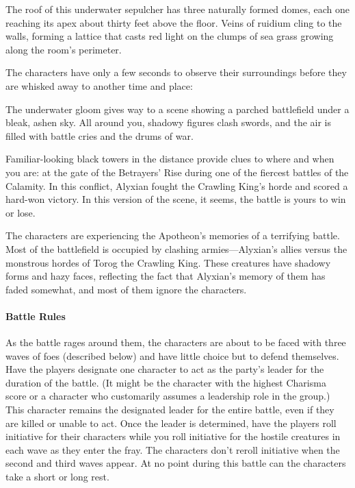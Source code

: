 \documentclass[10pt,a4paper,twoside,twocolumn,openany,nodeprecatedcode]{dndbook}
\begin{document}
\begin{DndReadAloud}{}
The roof of this underwater sepulcher has three naturally formed domes, each one reaching its apex about thirty feet above the floor. Veins of ruidium cling to the walls, forming a lattice that casts red light on the clumps of sea grass growing along the room's perimeter.

\end{DndReadAloud}

The characters have only a few seconds to observe their surroundings before they are whisked away to another time and place:

\begin{DndReadAloud}{}
The underwater gloom gives way to a scene showing a parched battlefield under a bleak, ashen sky. All around you, shadowy figures clash swords, and the air is filled with battle cries and the drums of war.

Familiar-looking black towers in the distance provide clues to where and when you are: at the gate of the Betrayers' Rise during one of the fiercest battles of the Calamity. In this conflict, Alyxian fought the Crawling King's horde and scored a hard-won victory. In this version of the scene, it seems, the battle is yours to win or lose.

\end{DndReadAloud}

The characters are experiencing the Apotheon's memories of a terrifying battle. Most of the battlefield is occupied by clashing armies—Alyxian's allies versus the monstrous hordes of Torog the Crawling King. These creatures have shadowy forms and hazy faces, reflecting the fact that Alyxian's memory of them has faded somewhat, and most of them ignore the characters.

\paragraph{Battle Rules}
As the battle rages around them, the characters are about to be faced with three waves of foes (described below) and have little choice but to defend themselves. Have the players designate one character to act as the party's leader for the duration of the battle. (It might be the character with the highest Charisma score or a character who customarily assumes a leadership role in the group.) This character remains the designated leader for the entire battle, even if they are killed or unable to act. Once the leader is determined, have the players roll initiative for their characters while you roll initiative for the hostile creatures in each wave as they enter the fray. The characters don't reroll initiative when the second and third waves appear. At no point during this battle can the characters take a short or long rest.
\end{document}
